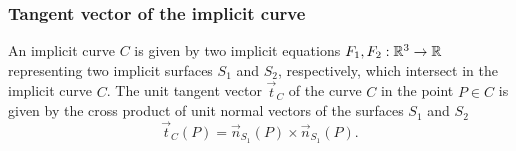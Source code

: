 \subsubsection {Tangent vector of the implicit curve}

An implicit curve $C$ is
given by two implicit equations $F_1, F_2: \mathbb{R}^3 \to \mathbb{R}$ representing two implicit
surfaces $S_1$ and $S_2$, respectively, which intersect in the implicit 
curve $C$. The unit tangent vector $\vec{t}_C$  
of the curve $C$ in the point $P \in C$ is given by the cross product of 
unit normal vectors of the surfaces $S_1$ and $S_2$
$$\vec{t}_C(P) = \vec{n}_{S_1}(P) \times \vec{n}_{S_1}(P).$$
